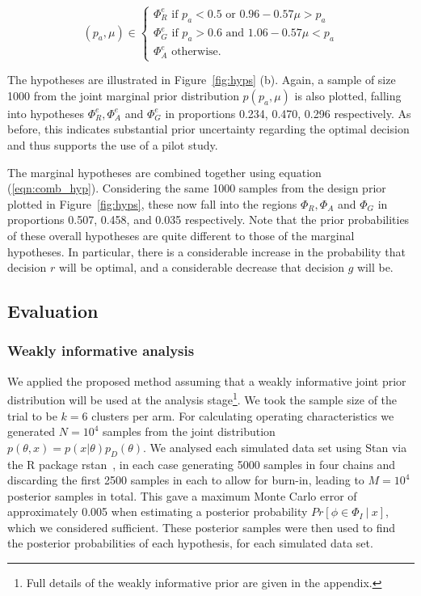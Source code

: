 \documentclass[AMA,STIX1COL]{WileyNJD-v2}
\begin{document}
\begin{equation}
  (p_{a}, \mu) \in \begin{cases}
               \Phi^e_R \text{ if } p_{a} < 0.5 \text{ or } 0.96-0.57\mu > p_{a} \\
               \Phi^e_G \text{ if } p_{a} > 0.6 \text{ and } 1.06-0.57\mu < p_{a} \\
               \Phi^e_A \text{ otherwise.}
            \end{cases}
\end{equation}

The hypotheses are illustrated in Figure~\ref{fig:hyps} (b). Again, a sample of size 1000 from the joint marginal prior distribution $p(p_{a}, \mu)$ is also plotted, falling into hypotheses $\Phi^e_R, \Phi^e_A$ and $\Phi^e_G$ in proportions 0.234, 0.470, 0.296 respectively. As before, this indicates substantial prior uncertainty regarding the optimal decision and thus supports the use of a pilot study.

The marginal hypotheses are combined together using equation (\ref{eqn:comb_hyp}). Considering the same 1000 samples from the design prior plotted in Figure~\ref{fig:hyps}, these now fall into the regions $\Phi_R, \Phi_A$ and $\Phi_G$ in proportions 0.507, 0.458, and 0.035 respectively. Note that the prior probabilities of these overall hypotheses are quite different to those of the marginal hypotheses. In particular, there is a considerable increase in the probability that decision $r$ will be optimal, and a considerable decrease that decision $g$ will be. 
\subsection{Evaluation}

\subsubsection{Weakly informative analysis}

We applied the proposed method assuming that a weakly informative joint prior distribution will be used at the analysis stage\footnote{Full details of the weakly informative prior are given in the appendix.}. We took the sample size of the trial to be $k = 6$ clusters per arm. For calculating operating characteristics we generated $N = 10^4$ samples from the joint distribution $p(\theta, x) = p(x | \theta)p_D(\theta)$. We analysed each simulated data set using Stan via the R package rstan~\cite{rstan}, in each case generating 5000 samples in four chains and discarding the first 2500 samples in each to allow for burn-in, leading to $M = 10^4$ posterior samples in total. This gave a maximum Monte Carlo error of approximately 0.005 when estimating a posterior probability $Pr[\phi \in \Phi_I ~|~ x]$, which we considered sufficient. These posterior samples were then used to find the posterior probabilities of each hypothesis, for each simulated data set.
\end{document}
